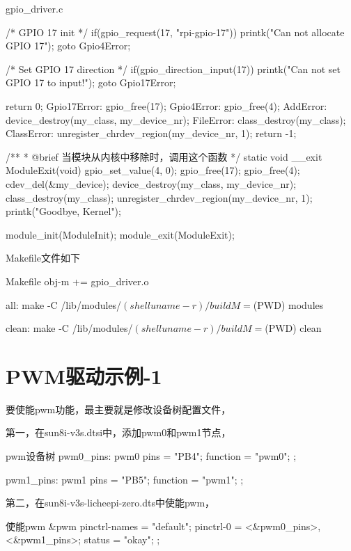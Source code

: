 \documentclass[lang=cn,newtx,10pt,scheme=chinese]{elegantbook}
\begin{document}
\begin{mycode}{gpio\_driver.c}
{    /* GPIO 17 init */
    if(gpio_request(17, "rpi-gpio-17")) {
        printk("Can not allocate GPIO 17\n");
        goto Gpio4Error;
    }

    /* Set GPIO 17 direction */
    if(gpio_direction_input(17)) {
        printk("Can not set GPIO 17 to input!\n");
        goto Gpio17Error;
    }


    return 0;
Gpio17Error:
    gpio_free(17);
Gpio4Error:
    gpio_free(4);
AddError:
    device_destroy(my_class, my_device_nr);
FileError:
    class_destroy(my_class);
ClassError:
    unregister_chrdev_region(my_device_nr, 1);
    return -1;
}

/**
 * @brief 当模块从内核中移除时，调用这个函数
 */
static void __exit ModuleExit(void) {
    gpio_set_value(4, 0);
    gpio_free(17);
    gpio_free(4);
    cdev_del(&my_device);
    device_destroy(my_class, my_device_nr);
    class_destroy(my_class);
    unregister_chrdev_region(my_device_nr, 1);
    printk("Goodbye, Kernel\n");
}

module_init(ModuleInit);
module_exit(ModuleExit);
\end{mycode}

Makefile文件如下

\begin{mycode}{Makefile}
obj-m += gpio_driver.o

all:
    make -C /lib/modules/$(shell uname -r)/build M=$(PWD) modules

clean:
    make -C /lib/modules/$(shell uname -r)/build M=$(PWD) clean
\end{mycode}

\chapter{PWM驱动示例-1}

要使能pwm功能，最主要就是修改设备树配置文件，

第一，在sun8i-v3s.dtsi中，添加pwm0和pwm1节点，

\begin{mycode}{pwm设备树}
pwm0_pins: pwm0 {
    pins = "PB4";
    function = "pwm0";
};

pwm1_pins: pwm1 {
    pins = "PB5";
    function = "pwm1";
};
\end{mycode}

第二，在sun8i-v3s-licheepi-zero.dts中使能pwm，

\begin{mycode}{使能pwm}
&pwm {
    pinctrl-names = "default";
    pinctrl-0 = <&pwm0_pins>, <&pwm1_pins>;
    status = "okay";
};
\end{mycode}
\end{document}

